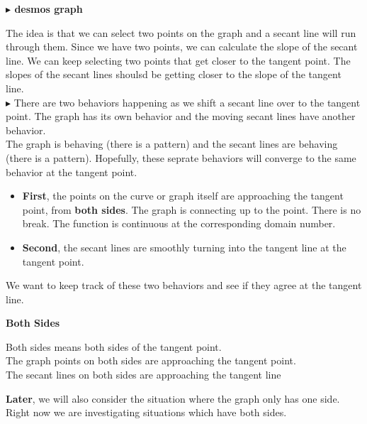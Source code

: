\documentclass{ximera}
\begin{document}
\textbf{\textcolor{blue!55!black}{$\blacktriangleright$ desmos graph}} 
\begin{center}
\end{center}


The idea is that we can select two points on the graph and a secant line will run through them. Since we have two points, we can calculate the slope of the secant line. We can keep selecting two points that get closer to the tangent point. The slopes of the secant lines shoulsd be getting closer to the slope of the tangent line. \\




\textbf{\textcolor{red!90!darkgray}{$\blacktriangleright$}} There are two behaviors happening as we shift a secant line over to the tangent point. The graph has its own behavior and the moving secant lines have another behavior. \\

The graph is behaving (there is a pattern) and the secant lines are behaving (there is a pattern). Hopefully, these seprate behaviors will converge to the same behavior at the tangent point.\\



\begin{itemize}
\item \textbf{First}, the points on the curve or graph itself are approaching the tangent point, from \textbf{both sides}. The graph is connecting up to the point. There is no break. The function is continuous at the corresponding domain number.\\
\item \textbf{Second}, the secant lines are smoothly turning into the tangent line at the tangent point. \\
\end{itemize}



We want to keep track of these two behaviors and see if they agree at the tangent line. \\


\begin{warning} \textbf{\textcolor{red!80!black}{Both Sides}}

Both sides means both sides of the tangent point. \\

The graph points on both sides are approaching the tangent point. \\

The secant lines on both sides are approaching the tangent line




\end{warning}
\textbf{Later}, we will also consider the situation where the graph only has one side. Right now we are investigating situations which have both sides.\\
\end{document}
